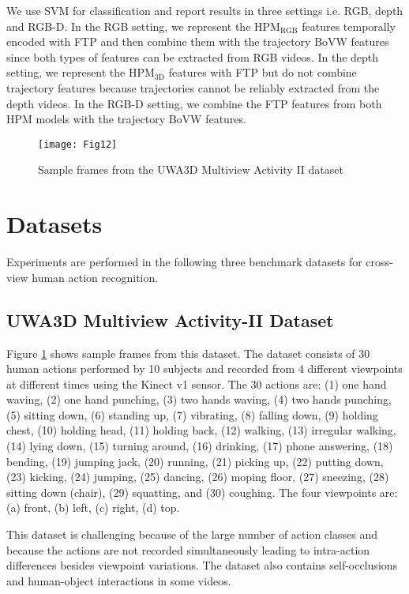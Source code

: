 \documentclass[twocolumn]{svjour3}          \smartqed  \usepackage{graphicx}
\begin{document}
We use SVM \citep{REF08a} for classification and report results in three settings i.e. RGB, depth and RGB-D. In the RGB setting, we represent the HPM$_{\mathrm{RGB}}$ features temporally encoded with FTP and then combine them with the trajectory BoVW features since both types of features can be extracted from RGB videos. In the depth setting, we represent the HPM$_{\mathrm{3D}}$ features with FTP but do not combine trajectory features because trajectories cannot be reliably extracted from the depth videos. In the RGB-D setting, we combine the FTP features from both HPM models with the trajectory BoVW features.

\begin{figure}[t]
\centering
\texttt{[image: Fig12]}
\caption{Sample frames from the UWA3D Multiview Activity II dataset \citep{HOPC2016PAMI}}
\label{fig:uwa3d_sample}
\end{figure}

\section{Datasets}

Experiments are performed in the following three benchmark datasets for cross-view human action recognition.

\subsection{UWA3D Multiview Activity-II Dataset}

Figure \ref{fig:uwa3d_sample} shows sample frames from this dataset. The dataset \citep{HOPC2016PAMI} consists of 30 human actions performed by 10 subjects and recorded from 4 different viewpoints at different times using the Kinect v1 sensor. The 30 actions are: (1) one hand waving, (2) one hand punching, (3) two hands waving, (4) two hands punching, (5) sitting down, (6) standing up, (7) vibrating, (8) falling down, (9) holding chest, (10) holding head, (11) holding back, (12) walking, (13) irregular walking, (14) lying down, (15) turning around, (16) drinking, (17) phone answering, (18) bending, (19) jumping jack, (20) running, (21) picking up, (22) putting down, (23) kicking, (24) jumping, (25) dancing, (26) moping floor, (27) sneezing, (28) sitting down (chair), (29) squatting, and (30) coughing. The four viewpoints are: (a) front, (b) left, (c) right, (d) top. 



This dataset is challenging because of the large number of action classes and because the actions are not recorded simultaneously leading to intra-action differences besides viewpoint variations. The dataset also contains self-occlusions and human-object interactions in some videos. 
\end{document}
